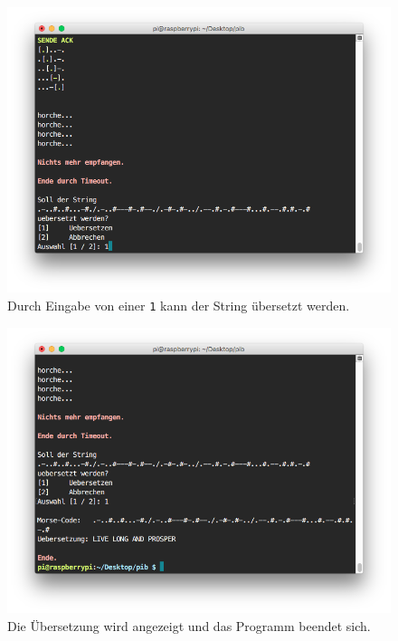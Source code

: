 \documentclass[12pt, a4paper]{article}
\begin{document}
\newpage
\begin{figure}[H]
	\centering
	\includegraphics[width=1.0\textwidth]{sshot_48.png}
	\caption{Durch Eingabe von einer \texttt{1} kann der String übersetzt werden.}
\end{figure}

\newpage
\begin{figure}[H]
	\centering
	\includegraphics[width=1.0\textwidth]{sshot_49.png}
	\caption{Die Übersetzung wird angezeigt und das Programm beendet sich.}
\end{figure}
\end{document}
